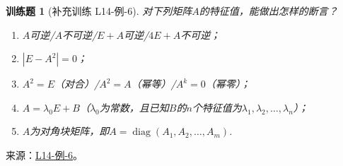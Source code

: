 \documentclass[UTF8,12pt,a4paper,fontset=fandol]{ctexart}
\newtheorem{exercise}{训练题}[section]
\begin{document}
\begin{exercise}[补充训练 L14-例-6]\label{prob:L14-例-6}
对下列矩阵$A$的特征值，能做出怎样的断言？
    \begin{enumerate}
        \item $A$可逆/$A$不可逆/$E+A$可逆/$4E+A$不可逆；

        \item $|E - A^2| = 0$；

        \item $A^2 = E$（对合）/$A^2 = A$（幂等）/$A^k = 0$（幂零）；

        \item $A=\lambda_0E+B$（$\lambda_0$为常数，且已知$B$的$n$个特征值为$\lambda_1,\lambda_2,\ldots,\lambda_n$）；

        \item $A$为对角块矩阵，即$A=\operatorname{diag}(A_1,A_2,\ldots,A_m)$.
    \end{enumerate}
\end{exercise}
\noindent 来源：\href{https://github.com/yhwu-is/Linear-Algebra-Left-Undone/blob/new/%E8%AE%B2%E4%B9%89/%E4%B8%93%E9%A2%98/14%20%E7%9B%B8%E4%BC%BC%E6%A0%87%E5%87%86%E5%BD%A2%EF%BC%9A%E5%8A%A8%E6%9C%BA%E4%B8%8E%E5%9F%BA%E7%A1%80.tex}{L14-例-6}。
\end{document}
